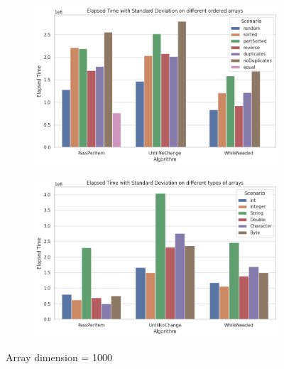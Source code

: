 \documentclass{article}
\begin{document}
\begin{figure}[H]
    \centering
    \begin{subfigure}[b]{0.4\textwidth}
        \centering
        \includegraphics[width=\textwidth]{./data/std_order_array_1000.png}
    \end{subfigure}
    \hfill
    \begin{subfigure}[b]{0.4\textwidth}
        \centering
        \includegraphics[width=\textwidth]{./data/std_type_array_1000.png}
    \end{subfigure}
    \caption{Array dimension = 1000}
\end{figure}
\end{document}
